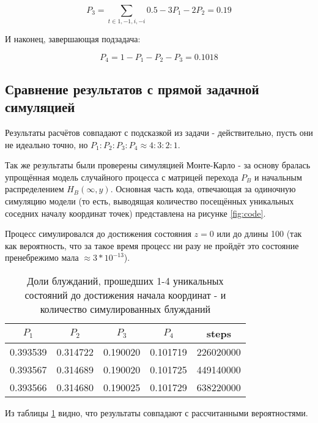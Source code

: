 \begin{equation}
P_3 = \sum_{t \in {1, -1, i,  -i}} 0.5 - 3 P_1 - 2 P_2 = 0.19
\end{equation}

И наконец, завершающая подзадача:

\begin{equation}
P_4 = 1 - P_1 - P_2 - P_3 = 0.1018
\end{equation}

\subsection{Сравнение результатов с прямой задачной симуляцией}

Результаты расчётов совпадают с подсказкой из задачи - действительно, пусть они не идеально точно, но $P_1:P_2:P_3:P_4 \approx 4:3:2:1$.
 
Так же результаты были проверены симуляцией Монте-Карло - за основу бралась упрощённая модель случайного процесса с матрицей перехода $P_B$ и
начальным распределением $H_B(\infty, y)$. Основная часть кода, отвечающая за одиночную симуляцию модели (то есть, выводящая количество посещённых уникальных соседних началу координат точек) представлена на рисунке \ref{fig:code}.  

Процесс симулировался до достижения состояния $z=0$ или до длины 100 (так как вероятность, что за такое время процесс ни разу не пройдёт
это состояние пренебрежимо мала $\approx 3 * 10^{-13}$).

\begin{table}[h!]
    \centering
    \begin{tabular}{|c|c|c|c|c|}
        \hline
        $P_1$ & $P_2$ & $P_3$ & $P_4$ & steps \\ \hline
         0.393539 & 0.314722 & 0.190020 & 0.101719 & 226020000 \\ \hline
		 0.393567 & 0.314689 & 0.190020 & 0.101725 & 449140000 \\ \hline
		 0.393566 & 0.314680 & 0.190025 & 0.101729 & 638220000 \\ \hline
    \end{tabular}
    \caption{Доли блужданий, прошедших 1-4 уникальных состояний до достижения начала координат - и количество симулированных блужданий}
    \label{tab:spitser_res_simple}
\end{table}

Из таблицы \ref{tab:spitser_res_simple} видно, что результаты совпадают с рассчитанными вероятностями.


